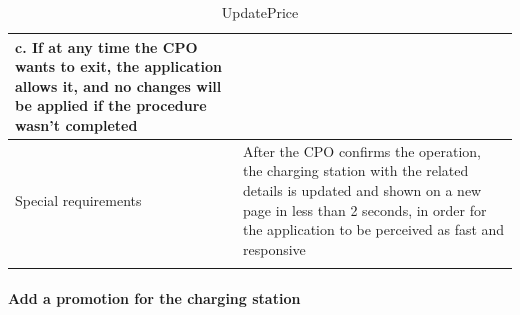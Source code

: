 \begin{center}
\begin{longtable}{p{4cm} p{11cm}}
                    c. If at any time the CPO wants to exit, the application allows it, and no changes will be applied if the procedure wasn't completed \\
     \hline
     Special requirements & After the CPO confirms the operation, the charging station with the related details is updated and shown on a new page in less than 2 seconds, in order for the application to be perceived as fast and responsive\\
     \hline
    \caption{UpdatePrice}
    \label{tab:UpdatePrice}
    \end{longtable}
\end{center}


\paragraph{Add a promotion for the charging station}
